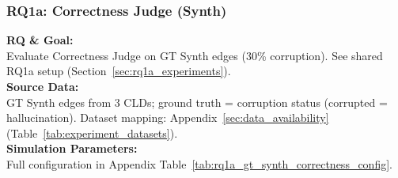 \subsubsection{RQ1a: Correctness Judge (Synth)}
\label{sec:rq1a_correctness_synth}

\textbf{RQ \& Goal:}\\
Evaluate Correctness Judge on GT Synth edges (30\% corruption). See shared RQ1a setup (Section~\ref{sec:rq1a_experiments}).\\
\textbf{Source Data:}\\
GT Synth edges from 3 CLDs; ground truth = corruption status (corrupted = hallucination). Dataset mapping: Appendix~\ref{sec:data_availability} (Table~\ref{tab:experiment_datasets}).\\
\textbf{Simulation Parameters:}\\
Full configuration in Appendix Table~\ref{tab:rq1a_gt_synth_correctness_config}.\\

